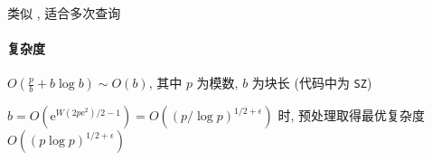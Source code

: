 类似 , 适合多次查询

\paragraph{复杂度}

\(\displaystyle O\left(\frac{p}{b}+b\log b\right)\sim O(b)\), 其中 \(p\) 为模数, \(b\) 为块长 (代码中为 \verb|SZ|)

\(b=O\left(\mathrm{e}^{W(2p \mathrm{e}^2)/2-1}\right)=O\left((p/\log p)^{1/2+\epsilon}\right)\) 时, 预处理取得最优复杂度 \(O\left((p\log p)^{1/2+\epsilon}\right)\)